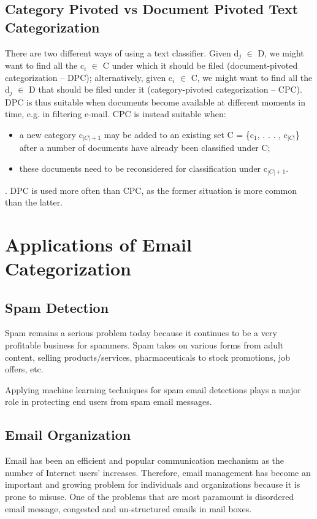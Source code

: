 \subsection{Category Pivoted vs Document Pivoted Text Categorization}
There are two different ways of using a text classifier. Given d$_{j}$ $\in$ D, we might want
to find all the c$_{i}$ $\in$ C under which it should be filed (document-pivoted categorization
– DPC); alternatively, given c$_{i}$ $\in$ C, we might want to find all the d$_{j}$ $\in$ D that should be filed under it (category-pivoted categorization – CPC).
DPC is thus suitable when documents become available at different moments in time, e.g. in filtering e-mail. CPC is instead suitable when: 
\begin{itemize}
\item a new category c$_{|C|+1}$ may be added to an existing set C = \{c$_{1}$, . . . , c$_{|C|}$\} after a number of documents have already been classified under C;
\item these documents need to be reconsidered for classification under c$_{|C|+1}$.
\end{itemize}. DPC is used more often than CPC, as the former situation is more common than the latter. \cite{Sebastiani2002}

\section{Applications of Email Categorization}
\subsection{Spam Detection}
Spam remains a serious problem today because it continues to be a very profitable business for spammers. Spam takes on various forms from adult content, selling products/services, pharmaceuticals to stock promotions, job offers, etc.

Applying machine learning techniques for spam email detections plays a major role in protecting end users from spam email messages.\cite{peifeng2007}

\subsection{Email Organization}
Email has been an efficient and popular communication mechanism as the number of
Internet users’ increases. Therefore, email management has become an important and growing problem for individuals and organizations because it is prone to misuse. One of the problems that are most paramount is disordered email message, congested and un-structured emails in mail boxes.

